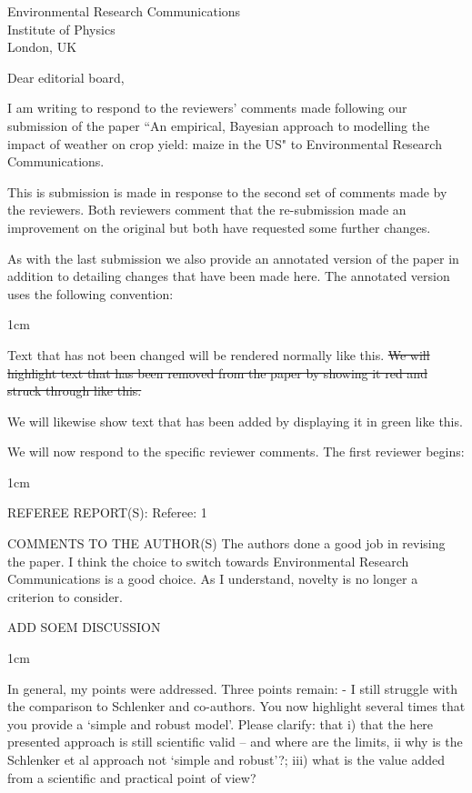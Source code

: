 \documentclass{letter}
\newcommand{\remove}[1]{   
    \color{red}
    \sout{#1}
    }
\newcommand{\add}[1]{   
    \color{green}
    #1
    }
\newcommand{\paper}[1]{   
    \begin{adjustwidth}{1cm}{}
    #1
    \end{adjustwidth}
    }
\newcommand{\review}[1]{   
    \begin{adjustwidth}{1cm}{}
    \em{#1}
    \end{adjustwidth}
    }
\begin{document}
\begin{letter}{Environmental Research Communications \\ Institute of Physics \\ London, UK}

\opening{Dear editorial board,}

I am writing to respond to the reviewers' comments made following our submission of the paper ``An empirical, Bayesian approach to modelling the impact of weather on crop yield: maize in the US" to Environmental Research Communications. 

This is submission is made in response to the second set of comments made by the reviewers. Both reviewers comment that the re-submission made an improvement on the original but both have requested some further changes.




As with the last submission we also provide an annotated version of the paper in addition to detailing changes that have been made here. The annotated version uses the following convention:
\paper{
Text that has not been changed will be rendered normally like this. \remove{We will highlight text that has been removed from the paper by showing it red and struck through like this.}\add{We will likewise show text that has been added by displaying it in green like this.}
}



We will now respond to the specific reviewer comments. The first reviewer begins:


\review{
REFEREE REPORT(S):
Referee: 1

COMMENTS TO THE AUTHOR(S)
The authors done a good job in revising the paper. I think the choice to switch towards Environmental Research Communications is a good choice. As I understand, novelty is no longer a criterion to consider.

}

{\color{red} ADD SOEM DISCUSSION}

\review{

In general, my points were addressed. Three points remain:
- I still struggle with the comparison to Schlenker and co-authors. You now highlight several times that you provide a ‘simple and robust model’. Please clarify: that i) that the here presented approach is still scientific valid – and where are the limits, ii why is the Schlenker et al approach not ‘simple and robust’?; iii) what is the value added from a scientific and practical point of view?

}
\end{letter}
\end{document}
